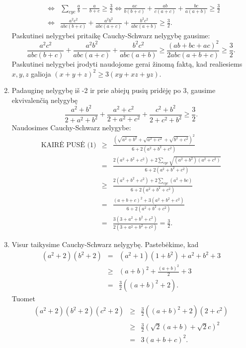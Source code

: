 \begin{enumerate}
\begin{eqnarray*}
&\Leftrightarrow&\sum_{cyc}{\frac{a}{b}-\frac{a}{b+c}}\geq\frac{3}{2}\Leftrightarrow\frac{ac}{b(b+c)}+\frac{ab}{c(a+c)}+\frac{bc}{a(a+b)}\geq\frac{3}{2}\\
&\Leftrightarrow&\frac{a^2c^2}{abc(b+c)}+\frac{a^2b^2}{abc(a+c)}+\frac{b^2c^2}{abc(a+b)}\geq\frac{3}{2}.\end{eqnarray*}
Paskutinei nelygybei pritaikę Cauchy-Schwarz nelygybę gausime:
$$\frac{a^2c^2}{abc(b+c)}+\frac{a^2b^2}{abc(a+c)}+\frac{b^2c^2}{abc(a+b)}\geq\frac{(ab+bc+ac)^2}{2abc(a+b+c)}\geq\frac{3}{2}.$$
Paskutinei nelygybei įrodyti naudojome gerai žinomą faktą, kad
realiesiems $x,y,z$ galioja $(x+y+z)^2\geq3(xy+xz+yz)$.
\item 
Padauginę nelygybę iš -2 ir prie abiejų pusių pridėję po 3, gausime
ekvivalenčią nelygybę
\begin{equation*}\frac{a^2+b^2}{2+a^2+b^2}+\frac{a^2+c^2}{2+a^2+c^2}+\frac{c^2+b^2}{2+c^2+b^2}\geq\frac{3}{2}.\tag{1}\end{equation*}
Naudosimes Cauchy-Schwarz nelygybe: \begin{eqnarray*}\text{KAIRĖ PUSĖ
(1)}&\geq&\frac{\left(\sqrt{a^2+b^2}+\sqrt{a^2+c^2}+\sqrt{b^2+c^2}\right)^2}{6+2(a^2+b^2+c^2)}\\&=&\frac{2(a^2+b^2+c^2)+2\sum\limits_{cyc}{\sqrt{(a^2+b^2)(a^2+c^2)}}}{6+2(a^2+b^2+c^2)}\\
&\geq&\frac{2(a^2+b^2+c^2)+2\sum\limits_{cyc}{(a^2+bc)}}{6+2(a^2+b^2+c^2)}\\
&=&\frac{(a+b+c)^2+3(a^2+b^2+c^2)}{6+2(a^2+b^2+c^2)}\\&=&\frac{3(3+a^2+b^2+c^2)}{2(3+a^2+b^2+c^2)}=\frac{3}{2}.\end{eqnarray*}
\item 
Visur taikysime Cauchy-Schwarz nelygybę. Pastebėkime, kad
\begin{eqnarray*}
(a^2+2)(b^2+2)&=&(a^2+1)(1+b^2)+a^2+b^2+3\\&\geq&(a+b)^2+\frac{(a+b)^2}{2}+3\\&=&\frac{3}{2}((a+b)^2+2).\end{eqnarray*}
Tuomet
\begin{eqnarray*}(a^2+2)(b^2+2)(c^2+2)&\geq&\frac{3}{2}((a+b)^2+2)(2+c^2)\\&\geq&\frac{3}{2}(\sqrt{2}(a+b)+\sqrt2c)^2\\&=&3(a+b+c)^2.\end{eqnarray*}
\end{enumerate} 
